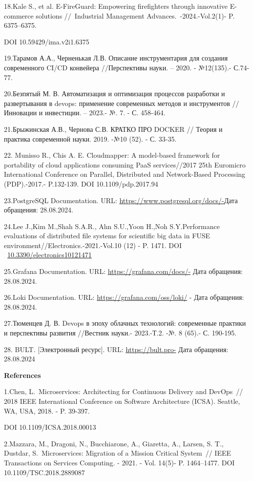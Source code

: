 {18.Kale S., et al. E-FireGuard: Empowering firefighters through
innovative E-commerce solutions //~Industrial Management
Advances.~-2024.-Vol.2(1)- P. 6375--6375.

DOI 10.59429/ima.v2i1.6375

19.Тарамов А.А., Черненькая Л.В. Описание инструментария для создания
современного CI/CD конвейера //Перспективы науки. -- 2020. - №12(135).-
С.74-77.

20.Безпятый М. В. Автоматизация и оптимизация процессов разработки и
развертывания в devops: применение современных методов и инструментов
//Инновации и инвестиции. -- 2023.- №. 7. - С. 458-464.

21.Брыжинская А.В., Чернова С.В. КРАТКО ПРО DOCKER // Теория и практика
современной науки. 2019. -№10 (52). - С. 33-35.

22. Munisso R., Chis A. E. Cloudmapper: A model-based framework for
portability of cloud applications consuming PaaS services//2017 25th
Euromicro International Conference on Parallel, Distributed and
Network-Based Processing (PDP).-2017.- P.132-139. DOI
10.1109/pdp.2017.94

23.PostgreSQL Documentation. URL:
\url{https://www.postgresql.org/docs/-}Дата обращения: 28.08.2024.

24.Lee J.,Kim M.,Shah S.A.R., Ahn S.U.,Yoon H.,Noh S.Y.Performance
evaluations of distributed file systems for scientific big data in FUSE
environment//Electronics.-2021.-Vol.10 (12) - P. 1471. DOI
~\href{https://doi.org/10.3390/electronics10121471}{10.3390/electronics10121471}

25.Grafana Documentation. URL: \url{https://grafana.com/docs/-} Дата
обращения: 28.08.2024.

26.Loki Documentation. URL: \url{https://grafana.com/oss/loki/} - Дата
обращения: 28.08.2024.

27.Тюменцев Д. В. Devops в эпоху облачных технологий: современные
практики и перспективы развития //Вестник науки.- 2023.-Т.2. -№. 8
(65).- С. 190-195.

28. BULT. {[}Электронный ресурс{]}. URL: \url{https://bult.pro-} Дата
обращения: 28.08.2024

{\bfseries References}

1.Chen, L.~Microservices: Architecting for Continuous Delivery and
DevOps~// 2018 IEEE International Conference on Software Architecture
(ICSA). Seattle, WA, USA, 2018. - P. 39-397.

DOI 10.1109/ICSA.2018.00013

2.Mazzara, M., Dragoni, N., Bucchiarone, A., Giaretta, A., Larsen, S.
T., Dustdar, S.~Microservices: Migration of a Mission Critical System~//
IEEE Transactions on Services Computing. - 2021. - Vol. 14(5)- P.
1464--1477. DOI 10.1109/TSC.2018.2889087

}
